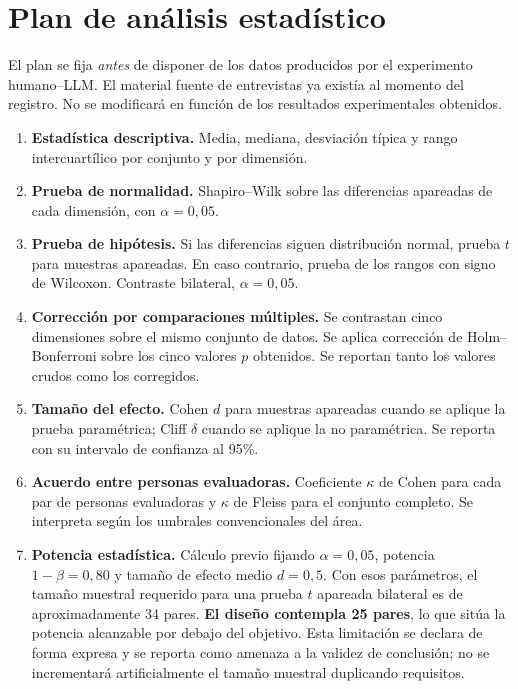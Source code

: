 \documentclass[11pt,a4paper]{article}
\begin{document}
\section{Plan de análisis estadístico}

El plan se fija \emph{antes} de disponer de los datos producidos por el experimento humano--LLM. El material fuente de entrevistas ya existía al momento del registro. No se modificará en función de los resultados experimentales obtenidos.

\begin{enumerate}[leftmargin=1.8em]
  \item \textbf{Estadística descriptiva.} Media, mediana, desviación típica y rango intercuartílico
        por conjunto y por dimensión.

  \item \textbf{Prueba de normalidad.} Shapiro--Wilk sobre las diferencias apareadas de cada
        dimensión, con $\alpha = 0{,}05$.

  \item \textbf{Prueba de hipótesis.} Si las diferencias siguen distribución normal, prueba $t$ para
        muestras apareadas. En caso contrario, prueba de los rangos con signo de Wilcoxon.
        Contraste bilateral, $\alpha = 0{,}05$.

  \item \textbf{Corrección por comparaciones múltiples.} Se contrastan cinco dimensiones sobre el
        mismo conjunto de datos. Se aplica corrección de Holm--Bonferroni sobre los cinco valores
        $p$ obtenidos. Se reportan tanto los valores crudos como los corregidos.

  \item \textbf{Tamaño del efecto.} Cohen $d$ para muestras apareadas cuando se aplique la prueba
        paramétrica; Cliff $\delta$ cuando se aplique la no paramétrica. Se reporta con su intervalo
        de confianza al 95\%.

  \item \textbf{Acuerdo entre personas evaluadoras.} Coeficiente $\kappa$ de Cohen para cada par de
        personas evaluadoras y $\kappa$ de Fleiss para el conjunto completo. Se interpreta según los
        umbrales convencionales del área.

  \item \textbf{Potencia estadística.} Cálculo previo fijando $\alpha = 0{,}05$, potencia
        $1-\beta = 0{,}80$ y tamaño de efecto medio $d = 0{,}5$. Con esos parámetros, el tamaño
        muestral requerido para una prueba $t$ apareada bilateral es de aproximadamente 34 pares.
        \textbf{El diseño contempla 25 pares}, lo que sitúa la potencia alcanzable por debajo del
        objetivo. Esta limitación se declara de forma expresa y se reporta como amenaza a la validez
        de conclusión; no se incrementará artificialmente el tamaño muestral duplicando requisitos.
\end{enumerate}
\end{document}
